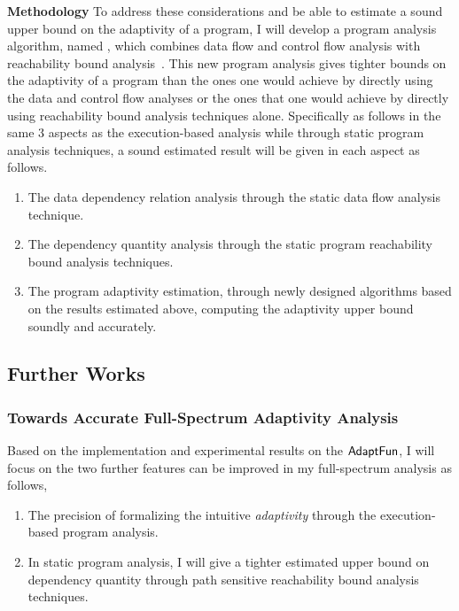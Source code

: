 \begin{itemize}
\textbf{Methodology}
To address these considerations and be able to estimate a sound upper bound on the adaptivity of a program, 
I will develop a program analysis algorithm, named {\THESYSTEM}, which combines data flow and control flow analysis with reachability bound analysis~\cite{GulwaniZ10}. 
This new program analysis gives tighter bounds on the adaptivity of a program than the ones one would achieve by directly using the data and control flow analyses or the ones that one would achieve by directly using reachability bound analysis techniques alone. Specifically as follows in the same 3 aspects as the execution-based analysis 
while through static program analysis techniques, a sound estimated result will be given in each aspect as follows.
\begin{enumerate}
\item The data dependency relation analysis through the static data flow analysis technique.
\item The dependency quantity analysis through the static program reachability bound analysis techniques.
\item The program adaptivity estimation, through newly designed algorithms based on the results estimated above, 
computing the adaptivity upper bound soundly 
and accurately.
\end{enumerate}
\end{itemize}%

\subsection{Further Works}
\subsubsection{Towards Accurate Full-Spectrum Adaptivity Analysis}
\label{subsec:intro-improve}
Based on the implementation and experimental results on the $\textsf{AdaptFun}$,
I will focus on the two further features can be improved in my full-spectrum analysis as follows,
\begin{enumerate}
 \item The precision of formalizing the intuitive \emph{adaptivity} 
through the execution-based program analysis.

\item In static program analysis, I will give a tighter estimated upper bound on dependency quantity through 
path sensitive reachability bound analysis techniques. 

\end{enumerate}
